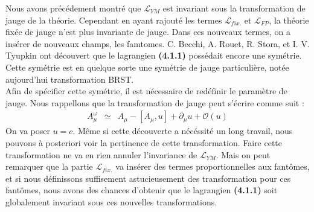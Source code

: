 \documentclass[a4paper,11pt]{article}
\theoremstyle{plain}
\theoremstyle{definition}
\theoremstyle{remark}
\numberwithin{equation}{section}
\numberwithin{equation}{subsection}
\numberwithin{figure}{section}
\begin{document}
\noindent
Nous avons précédement montré que $\mathcal{L}_{YM}$ est invariant sous la transformation de jauge de la théorie. Cependant en ayant 
rajouté les termes $\mathcal{L}_{fix.}$ et $\mathcal{L}_{FP} $, la théorie fixée de jauge n'est plus invariante de jauge. Dans ces 
nouveaux termes, on a insérer de nouveaux champs, les famtomes. C. Becchi, A. Rouet, R. Stora, et I. V. Tyupkin ont découvert que 
le lagrangien \textbf{(4.1.1)} possédait encore une symétrie. Cette symétrie est en quelque sorte une symétrie de jauge particulière, 
notée aujourd'hui transformation BRST. \\
Afin de spécifier cette symétrie, il est nécessaire de redéfinir le paramètre de jauge. Nous rappellons que la transformation de jauge 
peut s'écrire comme suit :
\begin{eqnarray}
  A^{\omega}_{\mu} &\simeq& A_{\mu} - [A_{\mu},u] + \partial_{\mu}u + \mathcal{O} (u)
\end{eqnarray}
On va poser $ u = c$. Même si cette découverte a nécéssité un long travail, nous pouvons à posteriori voir la pertinence de cette 
transformation. Faire cette transformation ne va en rien annuler l'invariance de $\mathcal{L}_{YM}$. Mais on peut remarquer que la 
partie $\mathcal{L}_{fix.}$ va insérer des termes proportionnelles aux fantômes, et si nous définissons suffisement astucieusement 
des transformation pour ces fantômes, nous avons des chances d'obtenir que le lagrangien \textbf{(4.1.1)}  soit globalement invariant 
sous ces nouvelles transformations.\\
\end{document}
